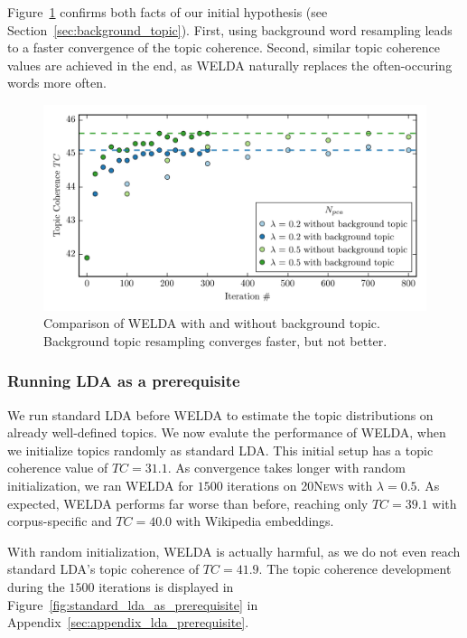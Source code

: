 \documentclass[
        a4paper,
        titlepage,
        twoside,
        parskip,
        numbers=noenddot
        ]{scrbook}
\theoremstyle{break}
\begin{document}
Figure~\ref{fig:welda_gaussian_background_topic} confirms both facts of our initial hypothesis (see Section~\ref{sec:background_topic}).
First, using background word resampling leads to a faster convergence of the topic coherence.
Second, similar topic coherence values are achieved in the end, as WELDA naturally replaces the often-occuring words more often.

\begin{figure}
       \centering
       \includegraphics[width=\textwidth]{figures/welda_gaussian_background_topic.png}
       \caption{Comparison of WELDA with and without background topic. Background topic resampling converges faster, but not better.}
       \label{fig:welda_gaussian_background_topic}
\end{figure}

\subsubsection{Running LDA as a prerequisite}

We run standard LDA before WELDA to estimate the topic distributions on already well-defined topics.
We now evalute the performance of WELDA, when we initialize topics randomly as standard LDA.
This initial setup has a topic coherence value of $TC = 31.1$.
As convergence takes longer with random initialization, we ran WELDA for $1500$ iterations on \textsc{20News} with $\lambda = 0.5$.
As expected, WELDA performs far worse than before, reaching only $TC = 39.1$ with corpus-specific and $TC = 40.0$ with Wikipedia embeddings.



With random initialization, WELDA is actually harmful, as we do not even reach standard LDA's topic coherence of $TC = 41.9$.
The topic coherence development during the $1500$ iterations is displayed in Figure~\ref{fig:standard_lda_as_prerequisite} in Appendix~\ref{sec:appendix_lda_prerequisite}.
\end{document}
